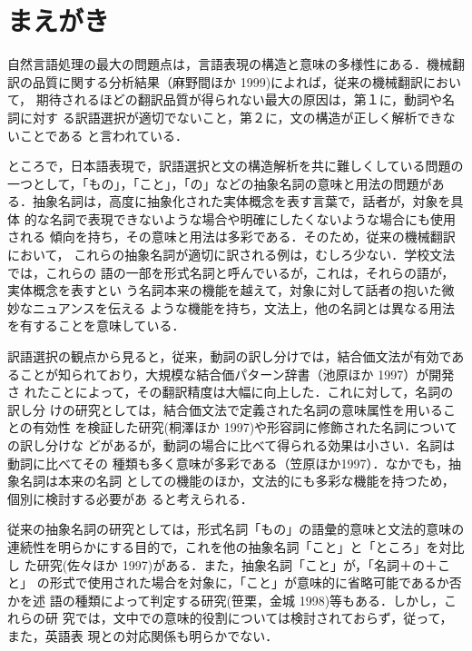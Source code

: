 

\maketitle


\section{まえがき}


自然言語処理の最大の問題点は，言語表現の構造と意味の多様性にある．機械翻
訳の品質に関する分析結果（麻野間ほか 1999)によれば，従来の機械翻訳において，
期待されるほどの翻訳品質が得られない最大の原因は，第１に，動詞や名詞に対す
る訳語選択が適切でないこと，第２に，文の構造が正しく解析できないことである
と言われている．

ところで，日本語表現で，訳語選択と文の構造解析を共に難しくしている問題の
一つとして，「もの」，「こと」，「の」などの抽象名詞の意味と用法の問題があ
る．抽象名詞は，高度に抽象化された実体概念を表す言葉で，話者が，対象を具体
的な名詞で表現できないような場合や明確にしたくないような場合にも使用される
傾向を持ち，その意味と用法は多彩である．そのため，従来の機械翻訳において，
これらの抽象名詞が適切に訳される例は，むしろ少ない．学校文法では，これらの
語の一部を形式名詞と呼んでいるが，これは，それらの語が，実体概念を表すとい
う名詞本来の機能を越えて，対象に対して話者の抱いた微妙なニュアンスを伝える
ような機能を持ち，文法上，他の名詞とは異なる用法を有することを意味している．

訳語選択の観点から見ると，従来，動詞の訳し分けでは，結合価文法が有効であ
ることが知られており，大規模な結合価パターン辞書（池原ほか 1997）が開発さ
れたことによって，その翻訳精度は大幅に向上した．これに対して，名詞の訳し分
けの研究としては，結合価文法で定義された名詞の意味属性を用いることの有効性
を検証した研究(桐澤ほか 1997)や形容詞に修飾された名詞についての訳し分けな
どがあるが，動詞の場合に比べて得られる効果は小さい．名詞は動詞に比べてその
種類も多く意味が多彩である（笠原ほか1997）．なかでも，抽象名詞は本来の名詞
としての機能のほか，文法的にも多彩な機能を持つため，個別に検討する必要があ
ると考えられる．

従来の抽象名詞の研究としては，形式名詞「もの」の語彙的意味と文法的意味の
連続性を明らかにする目的で，これを他の抽象名詞「こと」と「ところ」を対比し
た研究(佐々ほか 1997)がある．また，抽象名詞「こと」が，「名詞＋の＋こと」
の形式で使用された場合を対象に，「こと」が意味的に省略可能であるか否かを述
語の種類によって判定する研究(笹栗，金城 1998)等もある．しかし，これらの研
究では，文中での意味的役割については検討されておらず，従って，また，英語表
現との対応関係も明らかでない．

